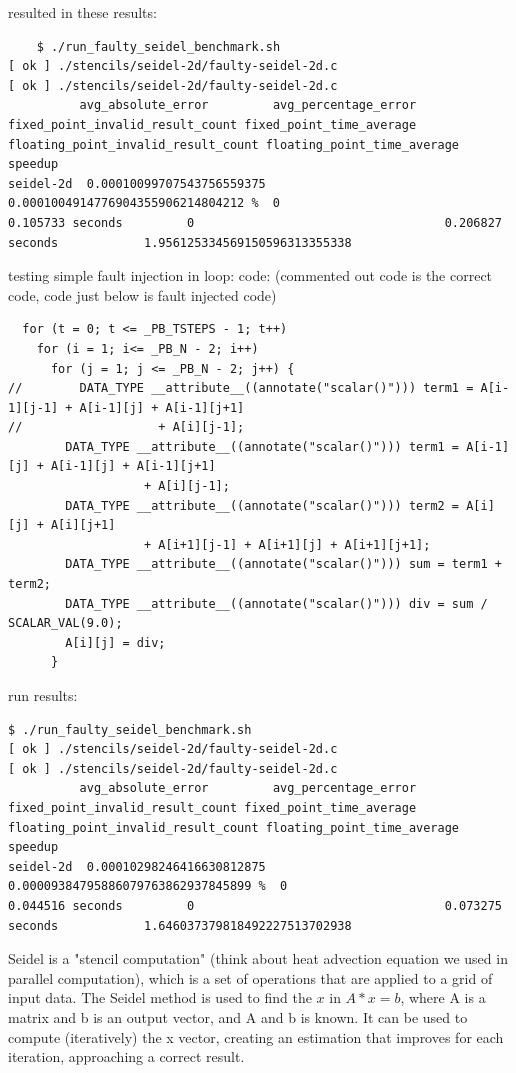 resulted in these results:
\begin{verbatim}
    $ ./run_faulty_seidel_benchmark.sh 
[ ok ] ./stencils/seidel-2d/faulty-seidel-2d.c
[ ok ] ./stencils/seidel-2d/faulty-seidel-2d.c
          avg_absolute_error         avg_percentage_error                 fixed_point_invalid_result_count fixed_point_time_average floating_point_invalid_result_count floating_point_time_average speedup                       
seidel-2d  0.00010099707543756559375  0.0001004914776904355906214804212 %  0                                0.105733 seconds         0                                   0.206827 seconds            1.956125334569150596313355338
\end{verbatim}


testing simple fault injection in loop:
code: (commented out code is the correct code, code just below is fault injected code)
\begin{verbatim}
  for (t = 0; t <= _PB_TSTEPS - 1; t++)
    for (i = 1; i<= _PB_N - 2; i++)
      for (j = 1; j <= _PB_N - 2; j++) {
//        DATA_TYPE __attribute__((annotate("scalar()"))) term1 = A[i-1][j-1] + A[i-1][j] + A[i-1][j+1]
//                   + A[i][j-1];
        DATA_TYPE __attribute__((annotate("scalar()"))) term1 = A[i-1][j] + A[i-1][j] + A[i-1][j+1]
                   + A[i][j-1];
        DATA_TYPE __attribute__((annotate("scalar()"))) term2 = A[i][j] + A[i][j+1]
                   + A[i+1][j-1] + A[i+1][j] + A[i+1][j+1];
        DATA_TYPE __attribute__((annotate("scalar()"))) sum = term1 + term2;
        DATA_TYPE __attribute__((annotate("scalar()"))) div = sum / SCALAR_VAL(9.0);
        A[i][j] = div;
      }
\end{verbatim}
run results:
\begin{verbatim}
$ ./run_faulty_seidel_benchmark.sh 
[ ok ] ./stencils/seidel-2d/faulty-seidel-2d.c
[ ok ] ./stencils/seidel-2d/faulty-seidel-2d.c
          avg_absolute_error         avg_percentage_error                  fixed_point_invalid_result_count fixed_point_time_average floating_point_invalid_result_count floating_point_time_average speedup                       
seidel-2d  0.00010298246416630812875  0.00009384795886079763862937845899 %  0                                0.044516 seconds         0                                   0.073275 seconds            1.646037379818492227513702938

\end{verbatim}


Seidel is a "stencil computation" (think about heat advection equation we used in parallel computation), which is a set of operations that are applied to a grid of input data. The Seidel method is used to find the $x$ in $A * x = b$, where A is a matrix and b is an output vector, and A and b is known. It can be used to compute (iteratively) the x vector, creating an estimation that improves for each iteration, approaching a correct result.


